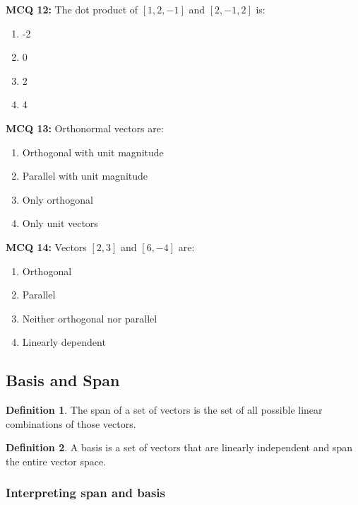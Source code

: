 \documentclass[11pt,a4paper]{article}
\theoremstyle{definition}
\newtheorem{definition}{Definition}[section]
\begin{document}
\noindent \textbf{MCQ 12:} The dot product of $[1, 2, -1]$ and $[2, -1, 2]$ is:

\begin{enumerate}
    \item -2
    \item 0
    \item 2
    \item 4
\end{enumerate}

\noindent \textbf{MCQ 13:} Orthonormal vectors are:

\begin{enumerate}
    \item Orthogonal with unit magnitude
    \item Parallel with unit magnitude
    \item Only orthogonal
    \item Only unit vectors
\end{enumerate}

\noindent \textbf{MCQ 14:} Vectors $[2, 3]$ and $[6, -4]$ are:

\begin{enumerate}
    \item Orthogonal
    \item Parallel
    \item Neither orthogonal nor parallel
    \item Linearly dependent
\end{enumerate}


\subsection{Basis and Span}


\begin{defbox}[Span]
\begin{definition}
The span of a set of vectors is the set of all possible linear combinations of those vectors.
\end{definition}
\end{defbox}

\begin{defbox}[Basis]
\begin{definition}
A basis is a set of vectors that are linearly independent and span the entire vector space.
\end{definition}
\end{defbox}

\subsubsection{Interpreting span and basis}
\end{document}
